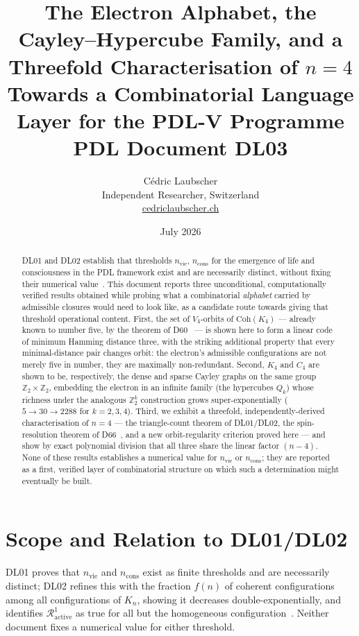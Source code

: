 \documentclass[11pt,a4paper]{article}
\title{\textbf{The Electron Alphabet, the Cayley--Hypercube Family, and a Threefold Characterisation of \texorpdfstring{$n=4$}{n=4}}\texorpdfstring{\\[4pt]\large Towards a Combinatorial Language Layer for the PDL-V Programme}{: Towards a Combinatorial Language Layer for the PDL-V Programme}\\[6pt]
{\large PDL Document DL03}}
\author{C\'edric Laubscher\\[4pt]
\small Independent Researcher, Switzerland\\
\small \href{https://cedriclaubscher.ch}{cedriclaubscher.ch}}
\date{July 2026}
\newcommand{\Kfour}{K_4}
\newcommand{\Coh}{\mathrm{Coh}}
\newcommand{\Zsub}{\mathbb{Z}_2}
\begin{document}
\maketitle

\begin{abstract}
DL01 and DL02 establish that thresholds $n_{\mathrm{vie}}$, $n_{\mathrm{cons}}$ for the emergence of life and consciousness in the PDL framework exist and are necessarily distinct, without fixing their numerical value~\citep{DL01,DL02}. This document reports three unconditional, computationally verified results obtained while probing what a combinatorial \emph{alphabet} carried by admissible closures would need to look like, as a candidate route towards giving that threshold operational content. First, the set of $V_4$-orbits of $\Coh(\Kfour)$ --- already known to number five, by the theorem of D60~\citep{D60} --- is shown here to form a linear code of minimum Hamming distance three, with the striking additional property that every minimal-distance pair changes orbit: the electron's admissible configurations are not merely five in number, they are maximally non-redundant. Second, $\Kfour$ and $C_4$ are shown to be, respectively, the dense and sparse Cayley graphs on the same group $\Zsub\times\Zsub$, embedding the electron in an infinite family (the hypercubes $Q_k$) whose richness under the analogous $\Zsub^k$ construction grows super-exponentially ($5\to30\to2288$ for $k=2,3,4$). Third, we exhibit a threefold, independently-derived characterisation of $n=4$ --- the triangle-count theorem of DL01/DL02, the spin-resolution theorem of D66~\citep{D66}, and a new orbit-regularity criterion proved here --- and show by exact polynomial division that all three share the linear factor $(n-4)$. None of these results establishes a numerical value for $n_{\mathrm{vie}}$ or $n_{\mathrm{cons}}$; they are reported as a first, verified layer of combinatorial structure on which such a determination might eventually be built.
\end{abstract}

\clearpage

\tableofcontents
\clearpage

\section{Scope and Relation to DL01/DL02}
\label{sec:scope}

DL01 proves that $n_{\mathrm{vie}}$ and $n_{\mathrm{cons}}$ exist as finite thresholds and are necessarily distinct; DL02 refines this with the fraction $f(n)$ of coherent configurations among all configurations of $K_n$, showing it decreases double-exponentially, and identifies $\mathcal{R}^1_{\mathrm{active}}$ as true for all but the homogeneous configuration~\citep{DL01,DL02}. Neither document fixes a numerical value for either threshold.
\end{document}
